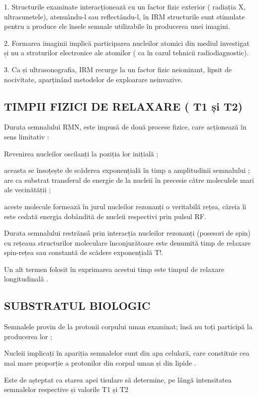 \documentclass{article}
\begin{document}
1. Structurile examinate interacționează cu un factor fizic exterior ( radiația X, ultrasunetele), atenuându-l sau reflectându-l, în IRM structurile sunt stimulate pentru a produce ele însele semnale utilizabile în producerea unei imagini. 

2. Formarea imaginii implică participarea nucleilor atomici din mediul investigat și nu a straturilor electronice ale atomilor ( ca în cazul tehnicii radiodiagnostic). 

3. Ca și ultrasonografia, IRM recurge la un factor fizic neionizant, lipsit de nocivitate, aparținând metodelor de exploarare neinvazive. 


\subsection{TIMPII FIZICI DE RELAXARE ( T1 și T2)}

Durata semnalului RMN, este impusă de două procese fizice, care acționează în sens limitativ : 

Revenirea nucleilor oscilanți la poziția lor inițială ; 

aceasta se însoțește de scăderea exponențială în timp a amplitudinii semnalului ; are ca substrat transferul de energie de la nucleii în precesie către moleculele mari ale vecinătății ;

aceste molecule formează în jurul nucleilor rezonanți o veritabilă rețea, căreia îi este cedată energia dobândită de nucleii respectivi prin pulsul RF. 

Durata semnalului restrănsâ prin interacția nucleilor rezonanți (posesori de spin) cu rețeaua structurilor moleculare înconjurătoare este denumită timp de relaxare spin-rețea sau constantă de scădere exponențială T!.

Un alt termen folosit în exprimarea acestui timp este timpul de relaxare longitudinală .


\subsection{SUBSTRATUL BIOLOGIC}


Semnalele provin de la protonii corpului uman examinat; însă nu toți participă la producerea lor ;

Nucleii implicați în apariția semnalelor sunt din apa celulară, care constituie cea mai mare proporție a protonilor din corpul uman și din lipide . 

Este de așteptat ca starea apei tisulare să determine, pe lângă intensitatea semnalelor respective și valorile T1 și T2
\end{document}
